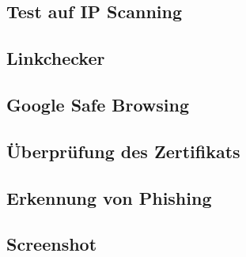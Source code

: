 \subsection{Test auf IP Scanning}

\subsection{Linkchecker}

\subsection{Google Safe Browsing}

\subsection{Überprüfung des Zertifikats}

\subsection{Erkennung von Phishing}

\subsection{Screenshot}
